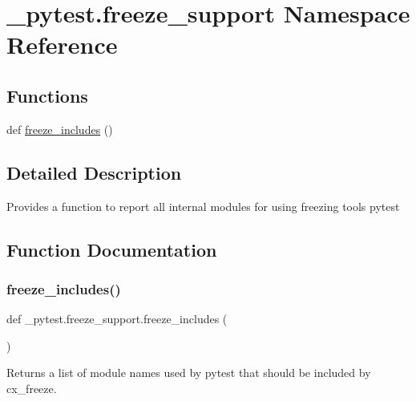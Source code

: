 \hypertarget{namespace__pytest_1_1freeze__support}{}\section{\+\_\+pytest.\+freeze\+\_\+support Namespace Reference}
\label{namespace__pytest_1_1freeze__support}
\subsection*{Functions}
\begin{DoxyCompactItemize}
\item 
def \hyperlink{namespace__pytest_1_1freeze__support_a1f2f54a7ebf1c9eb7650042817fc7978}{freeze\+\_\+includes} ()
\end{DoxyCompactItemize}


\subsection{Detailed Description}
\begin{DoxyVerb}Provides a function to report all internal modules for using freezing tools
pytest
\end{DoxyVerb}
 

\subsection{Function Documentation}
\mbox{\label{namespace__pytest_1_1freeze__support_a1f2f54a7ebf1c9eb7650042817fc7978}} 
\subsubsection{\texorpdfstring{freeze\+\_\+includes()}{freeze\_includes()}}
{\footnotesize\ttfamily def \+\_\+pytest.\+freeze\+\_\+support.\+freeze\+\_\+includes (\begin{DoxyParamCaption}{ }\end{DoxyParamCaption})}

\begin{DoxyVerb}Returns a list of module names used by pytest that should be
included by cx_freeze.
\end{DoxyVerb}
 